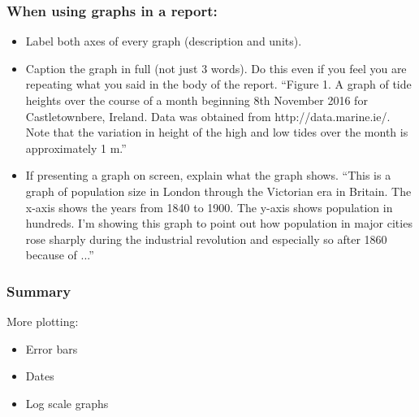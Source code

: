 \documentclass{beamer}
\begin{document}
\begin{frame}[fragile]
\frametitle{When using graphs in a report:}
\begin{itemize}
\item Label both axes of every graph (description and units).
\item Caption the graph in full (not just 3 words). Do this even if you
feel you are repeating what you said in the body of the report. ``Figure 1. A graph of tide heights over the course of a month beginning 8th November 2016 for Castletownbere, Ireland. Data was obtained from http://data.marine.ie/. Note that the variation in height of the high and low tides over the month is approximately 1 m.'' 
\item If presenting a graph on screen, explain what the graph
shows.
``This is a graph of population size in London through the
Victorian era in Britain.
The x-axis shows the years from 1840 to 1900.
The y-axis shows population in hundreds.
I'm showing this graph to point out how population in major
cities rose sharply during the industrial revolution and
especially so after 1860 because of ...''
\end{itemize}
\end{frame}


\begin{frame}[fragile]
\frametitle{Summary}
More plotting:
\begin{itemize}
\item Error bars
\item Dates
\item Log scale graphs
\end{itemize}
\end{frame}
\end{document}
